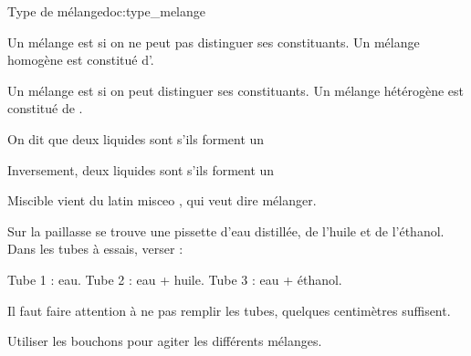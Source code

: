 \begin{doc}{Type de mélange}{doc:type_melange}
  \begin{encart}
    Un mélange est  si on ne peut pas distinguer ses constituants.
    Un mélange homogène est constitué d'.
  \end{encart}
  
  \begin{encart}
    Un mélange est  si on peut distinguer ses constituants.
    Un mélange hétérogène est constitué de .
  \end{encart}

  \begin{encart}
    On dit que deux liquides sont  s'ils forment un 
  \end{encart}
  \begin{encart}
    Inversement, deux liquides sont  s'ils forment un 
  \end{encart}
  Miscible vient du latin \og misceo \fg, qui veut dire mélanger.
\end{doc}


\mesure
Sur la paillasse se trouve une pissette d'eau distillée, de l'huile et de l'éthanol.
Dans les tubes à essais, verser :
\vspace*{-8pt}
\begin{center}
  \pointCyan Tube 1 : eau.
  \pointCyan Tube 2 : eau + huile.
  \pointCyan Tube 3 : eau + éthanol.
\end{center}
\vspace*{-8pt}
\attention Il faut faire attention à ne pas remplir les tubes, quelques centimètres suffisent.

\mesure 
Utiliser les bouchons pour agiter les différents mélanges.

%

%

%
  


